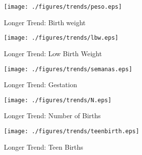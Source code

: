 \documentclass[10pt,letterpaper,subeqn,table]{beamer}
\begin{document}
\begin{frame}
\begin{figure}[htpb!]
  \begin{center}
  \centering
  \caption{Longer Trend: Birth weight}
  \texttt{[image: ./figures/trends/peso.eps]}
\end{center}
\end{figure}
\footnotesize{\hyperlink{Trends}{}}
\end{frame}

\begin{frame}
\begin{figure}[htpb!]
  \begin{center}
  \centering
  \caption{Longer Trend: Low Birth Weight}
  \texttt{[image: ./figures/trends/lbw.eps]}
\end{center}
\end{figure}
\footnotesize{\hyperlink{Trends}{}}
\end{frame}

\begin{frame}
\begin{figure}[htpb!]
  \begin{center}
  \centering
  \caption{Longer Trend: Gestation}
  \texttt{[image: ./figures/trends/semanas.eps]}
\end{center}
\end{figure}
\footnotesize{\hyperlink{Trends}{}}
\end{frame}

\begin{frame}
\begin{figure}[htpb!]
  \begin{center}
  \centering
  \caption{Longer Trend: Number of Births}
  \texttt{[image: ./figures/trends/N.eps]}
\end{center}
\end{figure}
\footnotesize{\hyperlink{Trends}{}}
\end{frame}

\begin{frame}
\begin{figure}[htpb!]
  \begin{center}
  \centering
  \caption{Longer Trend: Teen Births}
  \texttt{[image: ./figures/trends/teenbirth.eps]}
\end{center}
\end{figure}
\footnotesize{\hyperlink{Trends}{}}
\end{frame}
\end{document}
